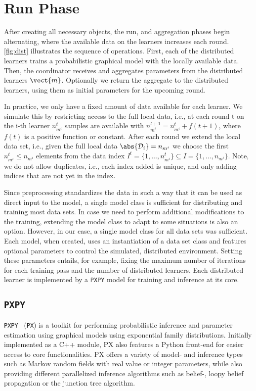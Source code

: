 \section{Run Phase}
After creating all necessary objects, the run, and aggregation phases begin alternating, where the available data on the learners increases each round.
\autoref{fig:dist} illustrates the sequence of operations.
First, each of the distributed learners trains a probabilistic graphical model with the locally available data.  
Then, the coordinator receives and aggregates parameters from the distributed learners $\vect{m}$. 
Optionally we return the aggregate to the distributed learners, using them as initial parameters for the upcoming round.

In practice, we only have a fixed amount of data available for each learner.
We simulate this by restricting access to the full local data, i.e., at each round t on the i-th learner  $n^{t}_{m^i}$ samples are available with $n^{t+1}_{m^i} = n^{t}_{m^i} + f(t+1)$, where $f(t)$ is a positive function or constant.
After each round we extend the local data set, i.e., given the full local data $\abs{\mathcal{D}_i} = n_{m^i}$  we choose the first  $ n^{t}_{m^i} \leq n_{m^i}$ elements from the data index $I^t =\{1, \ldots, n^{t}_{m^i}\} \subseteq I = \{1, \ldots, n_{m^i}\}$. 
Note, we do not allow duplicates, i.e., each index added is unique, and only adding indices that are not yet in the index.



Since preprocessing standardizes the data in such a way that it can be used as direct input to the model, a single model class is sufficient for distributing and training most data sets.
In case we need to perform additional modifications to the training, extending the model class to adapt to some situations is also an option.
However, in our case, a single model class for all data sets was sufficient.
Each model, when created, uses an instantiation of a data set class and features optional parameters to control the simulated, distributed environment. 
Setting these parameters entails, for example, fixing the maximum number of iterations for each training pass and the number of distributed learners.
Each distributed learner is implemented by a \texttt{PXPY} model for training and inference at its core.

\subsection{\texttt{PXPY}}
\texttt{PXPY}~\cite{piatkowski2018exponential} (\texttt{PX}) is a toolkit for performing probabilistic inference and parameter estimation using graphical models using exponential family distributions.
Initially implemented as a C++ module, PX also features a Python front-end for easier access to core functionalities.
PX offers a variety of model- and inference types such as Markov random fields with real value or integer parameters, while also providing different parallelized inference algorithms such as belief-, loopy belief propagation or the junction tree algorithm.

